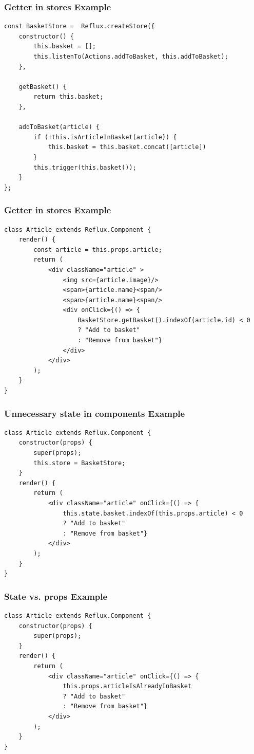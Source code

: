 \documentclass{beamer}
\begin{document}
\begin{frame}[fragile]\frametitle{Getter in stores \textendash{} Example}
\begin{lstlisting}[style=htmlcssjs]
const BasketStore =  Reflux.createStore({
    constructor() {
        this.basket = [];
        this.listenTo(Actions.addToBasket, this.addToBasket);
    },

    getBasket() {
        return this.basket;
    },

    addToBasket(article) {
        if (!this.isArticleInBasket(article)) {
            this.basket = this.basket.concat([article])
        }
        this.trigger(this.basket());
    }
};
\end{lstlisting}
\end{frame}

\begin{frame}[fragile]\frametitle{Getter in stores \textendash{} Example}
\begin{lstlisting}[style=htmlcssjs]
class Article extends Reflux.Component {
    render() {
        const article = this.props.article;
        return (
            <div className="article" >
                <img src={article.image}/>
                <span>{article.name}<span/>
                <span>{article.name}<span/>
                <div onClick={() => {
                    BasketStore.getBasket().indexOf(article.id) < 0
                    ? "Add to basket"
                    : "Remove from basket"}
                </div>
            </div>
        );
    }
}
\end{lstlisting}
\end{frame}

\begin{frame}[fragile]\frametitle{Unnecessary state in components \textendash{} Example}
\begin{lstlisting}[style=htmlcssjs]
class Article extends Reflux.Component {
    constructor(props) {
        super(props);
        this.store = BasketStore;
    }
    render() {
        return (
            <div className="article" onClick={() => {
                this.state.basket.indexOf(this.props.article) < 0
                ? "Add to basket"
                : "Remove from basket"}
            </div>
        );
    }
}
\end{lstlisting}
\end{frame}

\begin{frame}[fragile]\frametitle{State vs. props \textendash{} Example}
\begin{lstlisting}[style=htmlcssjs]
class Article extends Reflux.Component {
    constructor(props) {
        super(props);
    }
    render() {
        return (
            <div className="article" onClick={() => {
                this.props.articleIsAlreadyInBasket
                ? "Add to basket"
                : "Remove from basket"}
            </div>
        );
    }
}
\end{lstlisting}
\end{frame}
\end{document}
